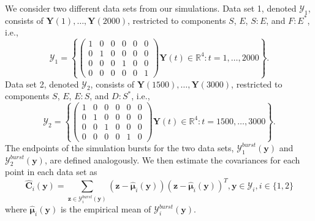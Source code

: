 We consider two different data sets from our simulations.
%
Data set 1, denoted $\mathcal{Y}_1$, consists of $\mathbf{Y}(1), \dots, \mathbf{Y}(2000)$, restricted to components $S$, $E$, $S:E$, and $F:E^{*}$, i.e.,
$$\mathcal{Y}_1 = \left\{
\left( \begin{array}{cccccc}
1 & 0 & 0 & 0 & 0 & 0 \\
0 & 1 & 0 & 0 & 0 & 0 \\
0 & 0 & 0 & 1 & 0 & 0 \\
0 & 0 & 0 & 0 & 0 & 1
\end{array} \right) \mathbf{Y}(t) \in \mathbb{R}^4: t=1, \dots, 2000 \right\}.$$
%
Data set 2, denoted $\mathcal{Y}_2$, consists of $\mathbf{Y}(1500), \dots, \mathbf{Y}(3000)$, restricted to components $S$, $E$, $E:S$, and $D:S^{*}$, i.e.,
$$\mathcal{Y}_2 = \left\{
\left( \begin{array}{cccccc}
1 & 0 & 0 & 0 & 0 & 0 \\
0 & 1 & 0 & 0 & 0 & 0 \\
0 & 0 & 1 & 0 & 0 & 0 \\
0 & 0 & 0 & 0 & 1 & 0
\end{array} \right)
\mathbf{Y}(t) \in \mathbb{R}^4: t=1500, \dots, 3000 \right\}.$$
%
The endpoints of the simulation bursts for the two data sets, $\mathcal{Y}^{burst}_1(\mathbf{y})$ and $\mathcal{Y}^{burst}_2(\mathbf{y})$, are defined analogously.
%
We then estimate the covariances for each point in each data set as
\begin{equation}
\widehat{\mathbf{C}}_i(\mathbf{y}) = \sum_{\mathbf{z} \in \mathcal{Y}^{burst}_i(\mathbf{y})} \left( \mathbf{z} - \hat{\mathbf{\mu}}_i(\mathbf{y}) \right)\left( \mathbf{z} - \hat{\mathbf{\mu}}_i(\mathbf{y}) \right)^T, \mathbf{y} \in \mathcal{Y}_i, i \in \{1, 2\}
\end{equation}
where $\hat{\mathbf{\mu}}_i(\mathbf{y})$ is the empirical mean of $\mathcal{Y}^{burst}_i(\mathbf{y})$.

